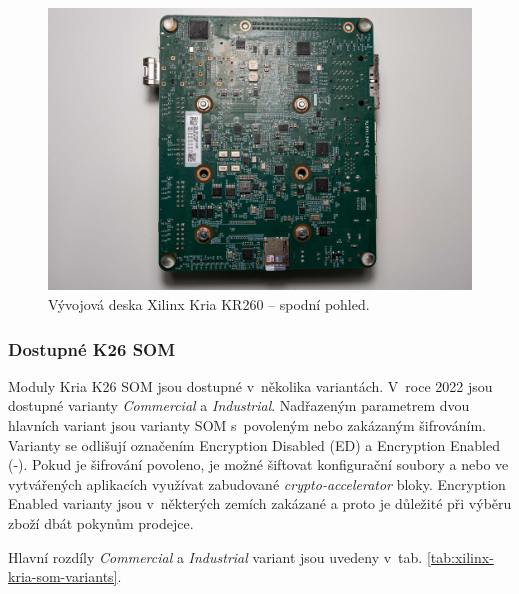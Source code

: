 \documentclass[a4paper, twoside, 11pt]{article}
\begin{document}
				\begin{figure}[H]
					\centering
						\includegraphics[width=1\textwidth]{src/jpg/xilinx-kria-foto-3.jpeg} 
						\caption{Vývojová deska Xilinx Kria KR260 – spodní pohled.}
						\label{fig:xilinx-kria-foto-3}
				\end{figure}
			
			
				\subsubsection{Dostupné K26 SOM}
					Moduly Kria K26 SOM jsou dostupné v~několika variantách. V~roce 2022 jsou dostupné varianty \textit{Commercial} a \textit{Industrial}. Nadřazeným parametrem dvou hlavních variant jsou varianty SOM s~povoleným nebo zakázaným šifrováním. Varianty se odlišují označením Encryption Disabled (ED) a Encryption Enabled (-). Pokud je šifrování povoleno, je možné šiftovat konfigurační soubory a nebo ve vytvářených aplikacích využívat zabudované \textit{crypto-accelerator} bloky. Encryption Enabled varianty jsou v~některých zemích zakázané a proto je důležité při výběru zboží dbát pokynům prodejce.
					\par Hlavní rozdíly \textit{Commercial} a \textit{Industrial} variant jsou uvedeny v~tab. \ref{tab:xilinx-kria-som-variants}.
\end{document}

